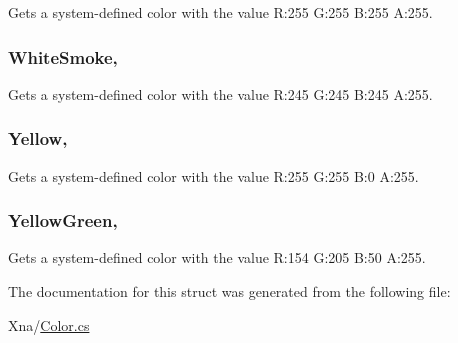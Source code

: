 Gets a system-\/defined color with the value R\+:255 G\+:255 B\+:255 A\+:255.

\hypertarget{structMicrosoft_1_1Xna_1_1Framework_1_1Color_a00333695959a7d43d1f0869826182f30}{}
\subsubsection[{White\+Smoke}]{ White\+Smoke\hspace{0.3cm}{\ttfamily [static]}, {\ttfamily [get]}}\label{structMicrosoft_1_1Xna_1_1Framework_1_1Color_a00333695959a7d43d1f0869826182f30}


Gets a system-\/defined color with the value R\+:245 G\+:245 B\+:245 A\+:255.

\hypertarget{structMicrosoft_1_1Xna_1_1Framework_1_1Color_a8317b63f8d153c779ba55709ade6f0b1}{}
\subsubsection[{Yellow}]{ Yellow\hspace{0.3cm}{\ttfamily [static]}, {\ttfamily [get]}}\label{structMicrosoft_1_1Xna_1_1Framework_1_1Color_a8317b63f8d153c779ba55709ade6f0b1}


Gets a system-\/defined color with the value R\+:255 G\+:255 B\+:0 A\+:255.

\hypertarget{structMicrosoft_1_1Xna_1_1Framework_1_1Color_a7f026027fb2931b7062ae964998591ec}{}
\subsubsection[{Yellow\+Green}]{ Yellow\+Green\hspace{0.3cm}{\ttfamily [static]}, {\ttfamily [get]}}\label{structMicrosoft_1_1Xna_1_1Framework_1_1Color_a7f026027fb2931b7062ae964998591ec}


Gets a system-\/defined color with the value R\+:154 G\+:205 B\+:50 A\+:255.



The documentation for this struct was generated from the following file\+:\begin{DoxyCompactItemize}
\item 
Xna/\hyperlink{Color_8cs}{Color.\+cs}\end{DoxyCompactItemize}
